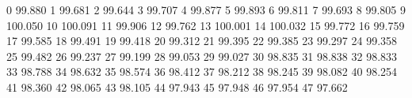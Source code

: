 0 99.880
1 99.681
2 99.644
3 99.707
4 99.877
5 99.893
6 99.811
7 99.693
8 99.805
9 100.050
10 100.091
11 99.906
12 99.762
13 100.001
14 100.032
15 99.772
16 99.759
17 99.585
18 99.491
19 99.418
20 99.312
21 99.395
22 99.385
23 99.297
24 99.358
25 99.482
26 99.237
27 99.199
28 99.053
29 99.027
30 98.835
31 98.838
32 98.833
33 98.788
34 98.632
35 98.574
36 98.412
37 98.212
38 98.245
39 98.082
40 98.254
41 98.360
42 98.065
43 98.105
44 97.943
45 97.948
46 97.954
47 97.662
